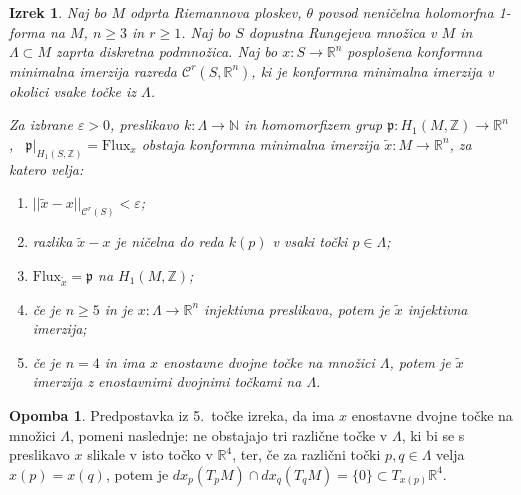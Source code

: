 \documentclass[12pt,a4paper,twoside]{article}
\theoremstyle{definition} %
\newtheorem{opomba}[definicija]{Opomba}
\theoremstyle{plain} %
\newtheorem{izrek}[definicija]{Izrek}
\numberwithin{equation}{section}  %
\newcommand{\R}{\mathbb R}
\newcommand{\N}{\mathbb N}
\newcommand{\Z}{\mathbb Z}
\begin{document}
\begin{izrek} \label{izr:glavni-izrek-CMI}
Naj bo $M$ odprta Riemannova ploskev, $\theta$ povsod neničelna holomorfna 1-forma na $M$, $n \geq 3$ in $r \geq 1$.
Naj bo $S$ dopustna Rungejeva množica v $M$ in $\Lambda \subset M$ zaprta diskretna podmnožica. 
Naj bo $x \colon S \to \R^{n}$ posplošena konformna minimalna imerzija razreda $\mathcal{C}^{r}(S, \R^{n})$, ki je konformna minimalna imerzija v okolici vsake točke iz $\Lambda$.

Za izbrane $\varepsilon > 0$, preslikavo $k \colon \Lambda \to \N$ in homomorfizem grup $\mathfrak{p} \colon H_{1}(M,\Z) \to \R^{n}$, \ $\mathfrak{p}|_{H_{1}(S,\Z)} = \text{Flux}_{x}$ obstaja konformna minimalna imerzija $\tilde{x} \colon M \to \R^{n}$, za katero velja:
\begin{enumerate}
\item $||\tilde{x} - x||_{\mathcal{C}^{r}(S)} < \varepsilon$;
\item razlika $\tilde{x}-x$ je ničelna do reda $k(p)$ v vsaki točki $p\in \Lambda$;
\item $\text{Flux}_{\tilde{x}} = \mathfrak{p}$ na $H_{1}(M,\Z)$;
\item če je $n\geq5$ in je $x \colon \Lambda \to \R^{n}$ injektivna preslikava, potem je $\tilde{x}$ injektivna imerzija;
\item če je $n=4$ in ima $x$ enostavne dvojne točke na množici $\Lambda$, potem je $\tilde{x}$ imerzija z enostavnimi dvojnimi točkami na $\Lambda$.
\end{enumerate}
\end{izrek}

\begin{opomba}
Predpostavka iz 5.~točke izreka, da ima $x$ enostavne dvojne točke na množici $\Lambda$, pomeni naslednje:
ne obstajajo tri različne točke v $\Lambda$, ki bi se s preslikavo $x$ slikale v isto točko v $\mathbb{R}^{4}$, ter, če za različni točki $p, q \in \Lambda$ velja $x(p) = x(q)$, potem je $dx_{p}(T_{p}M) \cap dx_{q}(T_{q}M) = \{ 0 \} \subset T_{x(p)}\mathbb{R}^{4}$.
\end{opomba}
\end{document}

